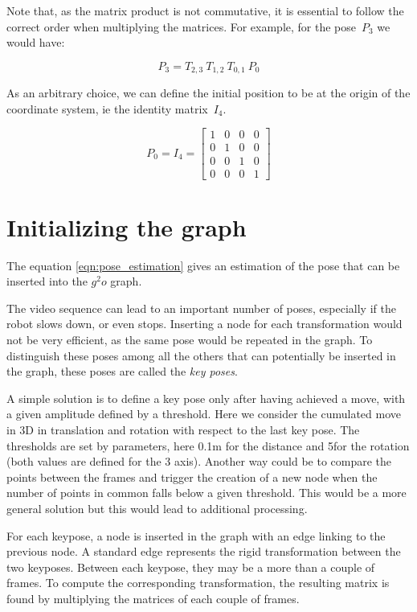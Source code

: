 Note that, as the matrix product is not commutative, it is essential to follow the correct order when multiplying the matrices. For example, for the pose~$P_3$ we would have:

\[
P_3 = T_{2,3} \: T_{1,2} \: T_{0,1} \: P_0
\]

As an arbitrary choice, we can define the initial position to be at the origin of the coordinate system, ie the identity matrix~$I_4$.

\[
P_0 = I_4 = \left[ \begin{array}{cccc}
1 & 0 & 0 & 0 \\
0 & 1 & 0 & 0 \\
0 & 0 & 1 & 0 \\
0 & 0 & 0 & 1 \end{array} \right] 
\]

\section{Initializing the graph}

The equation \ref{eqn:pose_estimation} gives an estimation of the pose that can be inserted into the $g^2o$ graph.

The video sequence can lead to an important number of poses, especially if the robot slows down, or even stops. Inserting a node for each transformation would not be very efficient, as the same pose would be repeated in the graph. To distinguish these poses among all the others that can potentially be inserted in the graph, these poses are called the \emph{key poses}. 

A simple solution is to define a key pose only after having achieved a move, with a given amplitude defined by a threshold. Here we consider the cumulated move in 3D in translation and rotation with respect to the last key pose. The thresholds are set by parameters, here 0.1m for the distance and 5\textdegree for the rotation (both values are defined for the 3 axis). Another way could be to compare the points between the frames and trigger the creation of a new node when the number of points in common falls below a given threshold. This would be a more general solution but this would lead to additional processing.

For each keypose, a node is inserted in the graph with an edge linking to the previous node. A standard edge represents the rigid transformation between the two keyposes. Between each keypose, they may be a more than a couple of frames. To compute the corresponding transformation, the resulting matrix is found by multiplying the matrices of each couple of frames.

